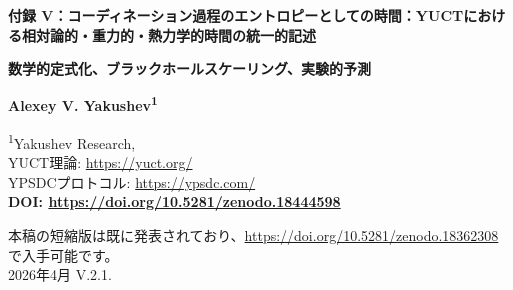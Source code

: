 \documentclass[12pt,a4paper]{article}
\newcommand{\Keff}{K_{\mathrm{eff}}}
\begin{document}
	
	\begin{titlepage}
		\begin{center}
			\vspace*{1cm}
			
			{\Huge\textbf{付録 V：コーディネーション過程のエントロピーとしての時間：YUCTにおける相対論的・重力的・熱力学的時間の統一的記述}}
			
			\vspace{1cm}
			{\Large\textbf{数学的定式化、ブラックホールスケーリング、実験的予測}}
			
			\vspace{1.5cm}
			
			{\Large\textbf{Alexey V. Yakushev\textsuperscript{1}}}
			
			\vspace{0.3cm}
			\large
			\textsuperscript{1}Yakushev Research, \\	YUCT理論: \url{https://yuct.org/}\\
			YPSDCプロトコル: \url{https://ypsdc.com/}\\
			
			
			\vspace{2cm}
			\textbf{DOI: \url{https://doi.org/10.5281/zenodo.18444598}}\\
			
			\vspace{1cm}
			
			\large 
			本稿の短縮版は既に発表されており、\url{https://doi.org/10.5281/zenodo.18362308} で入手可能です。\\
			\vspace{1cm}
			2026年4月 \quad \large V.2.1.
			
			\vspace{2cm}
			
			\begin{minipage}{0.9\textwidth}
				\begin{abstract}
					\noindent
					本付録は、ヤクシェフ統一コーディネーション理論（YUCT）における時間の新しい解釈を提示する。時間は、コーディネーション効率 \(\Keff\) によって定量化されるコーディネーション過程のエントロピーと同一視される。特殊相対論におけるローレンツ因子 \(\gamma\) および一般相対論における重力時間遅延が、\(\Keff\) の特定の形として自然に現れることを示す。固有時に対する統一的な表現 \(d\tau = dt/\Keff(v,\Phi)\) が導出され、これは適切な極限において標準的な公式に還元される。光子（\(v=c\)）に対しては \(\Keff \to \infty\) となり固有時は消失し、光が時間を経験しない理由が説明される。コーディネーションエントロピーの量子化は、プランクスケールにおける時間の基本的な離散性をもたらし、量子重力へとつながる。
					

\end{abstract}
\end{minipage}
\end{center}
\end{titlepage}
\end{document}
